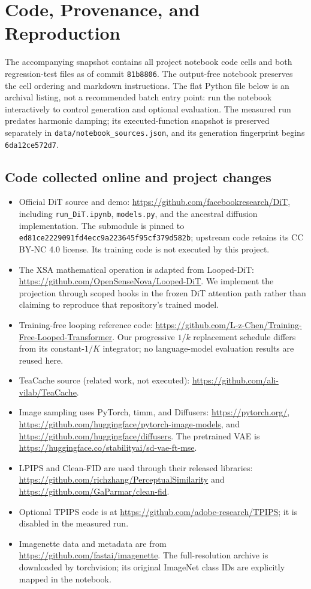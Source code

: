 \section{Code, Provenance, and Reproduction}
\label{app:code}
The accompanying snapshot contains all project notebook code cells and both
regression-test files as of commit \texttt{81b8806}. The output-free notebook
preserves the cell ordering and markdown instructions. The flat Python file
below is an archival listing, not a recommended batch entry point: run the
notebook interactively to control generation and optional evaluation.
The measured run predates harmonic damping; its executed-function snapshot
is preserved separately in \texttt{data/notebook\_sources.json}, and its
generation fingerprint begins \texttt{6da12ce572d7}.

\subsection{Code collected online and project changes}
\begin{itemize}
\item Official DiT source and demo: \url{https://github.com/facebookresearch/DiT},
including \texttt{run\_DiT.ipynb}, \texttt{models.py}, and the ancestral
diffusion implementation. The submodule is pinned to
\texttt{ed81ce2229091fd4ecc9a223645f95cf379d582b}; upstream code retains its
CC BY-NC 4.0 license. Its training code is not executed by this project.
\item The XSA mathematical operation is adapted from Looped-DiT:
\url{https://github.com/OpenSenseNova/Looped-DiT}. We implement the projection
through scoped hooks in the frozen DiT attention path rather than claiming
to reproduce that repository's trained model.
\item Training-free looping reference code:
\url{https://github.com/L-z-Chen/Training-Free-Looped-Transformer}.
Our progressive $1/k$ replacement schedule differs from its constant-$1/K$
integrator; no language-model evaluation results are reused here.
\item TeaCache source (related work, not executed):
\url{https://github.com/ali-vilab/TeaCache}.
\item Image sampling uses PyTorch, timm, and Diffusers:
\url{https://pytorch.org/}, \url{https://github.com/huggingface/pytorch-image-models},
and \url{https://github.com/huggingface/diffusers}.
The pretrained VAE is \url{https://huggingface.co/stabilityai/sd-vae-ft-mse}.
\item LPIPS and Clean-FID are used through their released libraries:
\url{https://github.com/richzhang/PerceptualSimilarity} and
\url{https://github.com/GaParmar/clean-fid}.
\item Optional TPIPS code is at
\url{https://github.com/adobe-research/TPIPS}; it is disabled in the measured run.
\item Imagenette data and metadata are from
\url{https://github.com/fastai/imagenette}. The full-resolution archive is
downloaded by torchvision; its original ImageNet class IDs are explicitly
mapped in the notebook.
\end{itemize}


